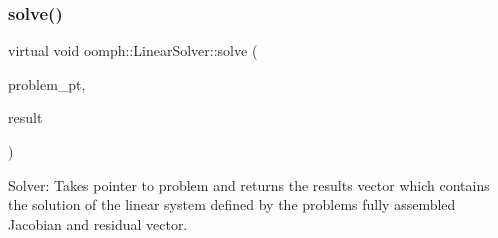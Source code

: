\mbox{\label{classoomph_1_1LinearSolver_a15ce22542b74ed1826ea485edacbeb6e}} 
\subsubsection{\texorpdfstring{solve()}{solve()}\hspace{0.1cm}{\footnotesize\ttfamily [1/3]}}
{\footnotesize\ttfamily virtual void oomph\+::\+Linear\+Solver\+::solve (\begin{DoxyParamCaption}\item[{\hyperlink{classoomph_1_1Problem}{Problem} $\ast$const \&}]{problem\+\_\+pt,  }\item[{\hyperlink{classoomph_1_1DoubleVector}{Double\+Vector} \&}]{result }\end{DoxyParamCaption})\hspace{0.3cm}{\ttfamily [pure virtual]}}



Solver\+: Takes pointer to problem and returns the results vector which contains the solution of the linear system defined by the problem\textquotesingle{}s fully assembled Jacobian and residual vector. 



